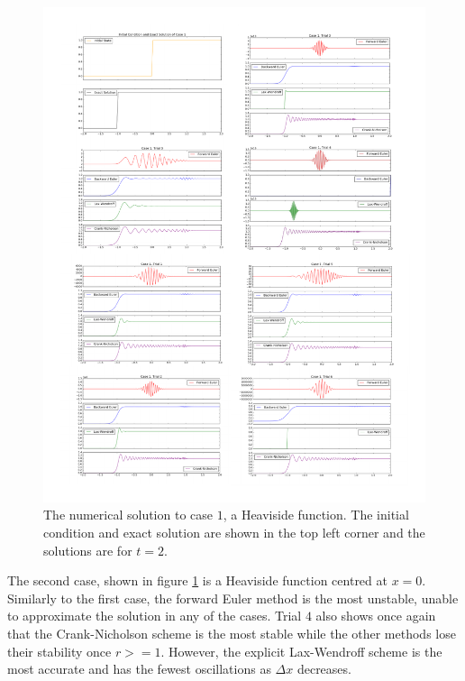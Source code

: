 \documentclass[twocolumn]{article}
\begin{document}
\begin{figure}[ph]
	\centering
	\includegraphics[width=\textwidth, trim=0 0 0 4.5cm]{case1}
	\caption{
		The numerical solution to case $1$, a Heaviside function. The
		initial condition and exact solution are shown in the top left
		corner and the solutions are for $t=2$.
	}
	\label{fig:case1}
\end{figure}

The second case, shown in figure \ref{fig:case1} is a Heaviside
function centred at $x=0$. Similarly to the first case, the forward
Euler method is the most unstable, unable to approximate the solution
in any of the cases. Trial $4$ also shows once again that the
Crank-Nicholson scheme is the most stable while the other methods lose
their stability once $r >= 1$. However, the explicit Lax-Wendroff
scheme is the most accurate and has the fewest oscillations as $\Delta
x$ decreases.
\end{document}
